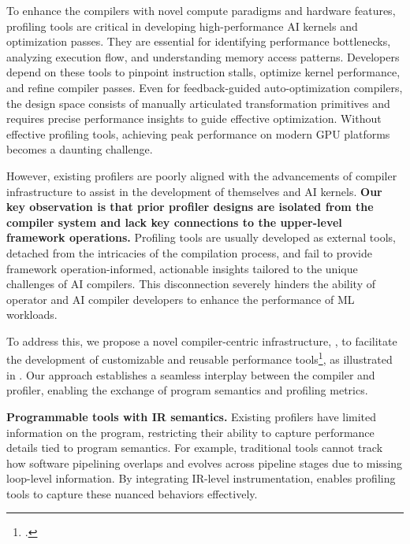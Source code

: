 To enhance the compilers with novel compute paradigms and hardware features, profiling tools are critical in developing high-performance AI kernels and optimization passes. 
They are essential for identifying performance bottlenecks, analyzing execution flow, and understanding memory access patterns.
Developers depend on these tools to pinpoint instruction stalls, optimize kernel performance, and refine compiler passes. 
Even for feedback-guided auto-optimization compilers\cite{zheng2020ansor}, the design space consists of manually articulated transformation primitives and requires precise performance insights to guide effective optimization. 
Without effective profiling tools, achieving peak performance on modern GPU platforms becomes a daunting challenge.

However, existing profilers are poorly aligned with the advancements of compiler infrastructure to assist in the development of themselves and AI kernels.
\textbf{Our key observation is that prior profiler designs are isolated from the compiler system and lack key connections to the upper-level framework operations.}
Profiling tools are usually developed as external tools, detached from the intricacies of the compilation process, and fail to provide framework operation-informed, actionable insights tailored to the unique challenges of AI compilers. 
This disconnection severely hinders the ability of operator and AI compiler developers to enhance the performance of ML workloads.


To address this, we propose a novel compiler-centric infrastructure, \thiswork{}, to facilitate the development of customizable and reusable performance tools\footnote{.}, as illustrated in \Fig{\ref{fig:concept}}.
Our approach establishes a seamless interplay between the compiler and profiler, enabling the exchange of program semantics and profiling metrics. 

\textbf{ Programmable tools with IR semantics.} Existing profilers have limited information on the program, restricting their ability to capture performance details tied to program semantics. For example, traditional tools cannot track how software pipelining\cite{huang_alcop_2023} overlaps and evolves across pipeline stages due to missing loop-level information. By integrating IR-level instrumentation, \thiswork{} enables profiling tools to capture these nuanced behaviors effectively.

